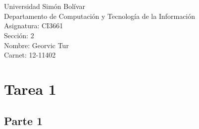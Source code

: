 \documentclass{article}
\begin{document}
\section*{}

\begin{center}
Universidad Simón Bolívar
\\Departamento de Computación y Tecnología de la Información
\\Asignatura: CI3661
\\Sección: 2
\\Nombre: Georvic Tur 
\\Carnet: 12-11402

\section*{Tarea 1}

\end{center}


\subsection*{Parte 1}
\end{document}
